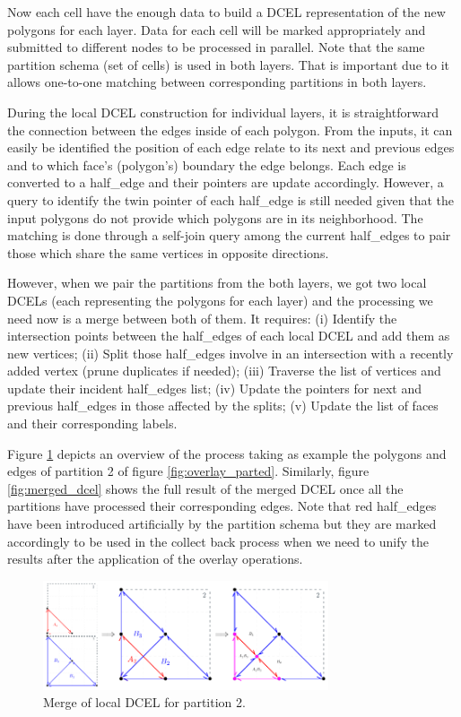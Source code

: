 Now each cell have the enough data to build a DCEL representation of the new polygons for each layer.  Data for each cell will be marked appropriately and submitted to different nodes to be processed in parallel.  Note that the same partition schema (set of cells) is used in both layers.  That is important due to it allows one-to-one matching between corresponding partitions in both layers.

During the local DCEL construction for individual layers, it is straightforward the connection between the edges inside of each polygon.  From the inputs, it can easily be identified the position of each edge relate to its next and previous edges and to which face's (polygon's) boundary the edge belongs.  Each edge is converted to a half\_edge and their pointers are update accordingly.  However, a query to identify the twin pointer of each half\_edge is still needed given that the input polygons do not provide which polygons are in its neighborhood. The matching is done through a self-join query among the current half\_edges to pair those which share the same vertices in opposite directions.

However, when we pair the partitions from the both layers, we got two local DCELs (each representing the polygons for each layer) and the processing we need now is a merge between both of them.  It requires: (i) Identify the intersection points between the half\_edges of each local DCEL and add them as new vertices; (ii) Split those half\_edges involve in an intersection with a recently added vertex (prune duplicates if needed); (iii) Traverse the list of vertices and update their incident half\_edges list; (iv) Update the pointers for next and previous half\_edges in those affected by the splits; (v) Update the list of faces and their corresponding labels.

Figure \ref{fig:part2} depicts an overview of the process taking as example the polygons and edges of partition 2 of figure \ref{fig:overlay_parted}.  Similarly, figure \ref{fig:merged_dcel} shows the full result of the merged DCEL once all the partitions have processed their corresponding edges. Note that red half\_edges have been introduced artificially by the partition schema but they are marked accordingly to be used in the collect back process when we need to unify the results after the application of the overlay operations.

\begin{figure}[!ht]
    \centering
    \includegraphics[width=0.75\textwidth]{figures/02-Part2}
    \caption{Merge of local DCEL for partition 2.}\label{fig:part2}
\end{figure}

